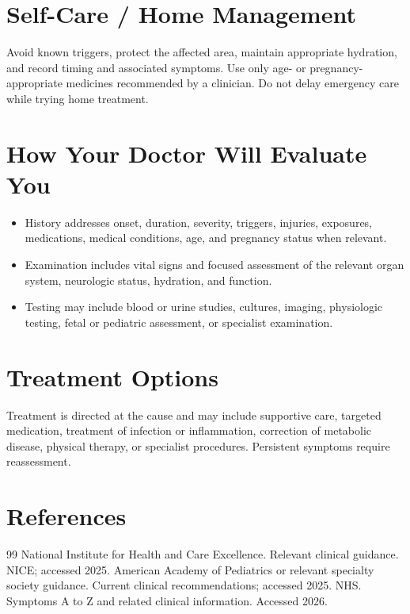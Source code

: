 \section*{Self-Care / Home Management}
Avoid known triggers, protect the affected area, maintain appropriate hydration, and record timing and associated symptoms. Use only age- or pregnancy-appropriate medicines recommended by a clinician. Do not delay emergency care while trying home treatment.

\section*{How Your Doctor Will Evaluate You}
\begin{itemize}
  \item History addresses onset, duration, severity, triggers, injuries, exposures, medications, medical conditions, age, and pregnancy status when relevant.
  \item Examination includes vital signs and focused assessment of the relevant organ system, neurologic status, hydration, and function.
  \item Testing may include blood or urine studies, cultures, imaging, physiologic testing, fetal or pediatric assessment, or specialist examination.
\end{itemize}

\section*{Treatment Options}
Treatment is directed at the cause and may include supportive care, targeted medication, treatment of infection or inflammation, correction of metabolic disease, physical therapy, or specialist procedures. Persistent symptoms require reassessment.

\section*{References}
\begin{thebibliography}{99}
 National Institute for Health and Care Excellence. Relevant clinical guidance. NICE; accessed 2025.
 American Academy of Pediatrics or relevant specialty society guidance. Current clinical recommendations; accessed 2025.
 NHS. Symptoms A to Z and related clinical information. Accessed 2026.
\end{thebibliography}
